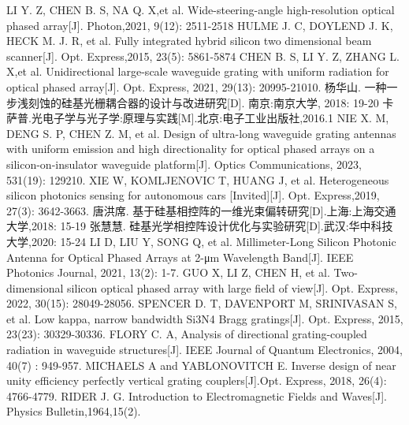 \documentclass[UTF8,a4paper,12pt]{ctexart}
\numberwithin{equation}{section}
\begin{document}
\begin{thebibliography}{1}
 LI Y. Z, CHEN B. S, NA Q. X,et al. Wide-steering-angle high-resolution optical phased array[J]. Photon,2021, 9(12):  2511-2518
HULME J. C,  DOYLEND J. K, HECK M. J. R, et al. Fully integrated hybrid silicon two dimensional beam scanner[J]. Opt. Express,2015, 23(5):  5861-5874
CHEN B. S, LI  Y. Z, ZHANG  L. X,et al. Unidirectional large-scale waveguide grating with uniform radiation for optical phased array[J]. Opt. Express,  2021, 29(13): 20995-21010.
杨华山. 一种一步浅刻蚀的硅基光栅耦合器的设计与改进研究[D]. 南京:南京大学, 2018: 19-20
卡萨普.光电子学与光子学:原理与实践[M].北京:电子工业出版社,2016.1
NIE X. M, DENG  S. P, CHEN  Z. M, et al.
Design of ultra-long waveguide grating antennas with uniform emission and high directionality for optical phased arrays on a silicon-on-insulator waveguide platform[J].
Optics Communications, 2023, 
531(19): 129210.
 XIE W,  KOMLJENOVIC T, HUANG J, et al. Heterogeneous silicon photonics sensing for
autonomous cars [Invited][J]. Opt. Express,2019, 27(3):  3642-3663.
唐洪席. 基于硅基相控阵的一维光束偏转研究[D].上海:上海交通大学,2018: 15-19
张慧慧. 硅基光学相控阵设计优化与实验研究[D].武汉:华中科技大学,2020: 15-24
LI D, LIU Y,  SONG Q, et al. Millimeter-Long Silicon Photonic Antenna for Optical Phased Arrays at 2-μm Wavelength Band[J]. IEEE Photonics Journal,  2021, 13(2): 1-7.
GUO X, LI Z,  CHEN H, et al. Two-dimensional silicon optical phased array with large field of view[J]. Opt. Express, 2022, 30(15): 28049-28056.
SPENCER D. T, DAVENPORT M, SRINIVASAN S, et al. Low kappa, narrow bandwidth Si3N4 Bragg gratings[J]. Opt. Express, 2015, 23(23): 30329-30336.
FLORY C. A, Analysis of directional grating-coupled radiation in waveguide structures[J]. IEEE Journal of Quantum Electronics, 2004, 40(7) : 949-957.
MICHAELS A and  YABLONOVITCH E. Inverse design of near unity efficiency perfectly vertical grating couplers[J].Opt. Express, 2018, 26(4): 4766-4779.
RIDER J. G. Introduction to Electromagnetic Fields and Waves[J]. Physics Bulletin,1964,15(2).







\end{thebibliography}%
\end{document}
